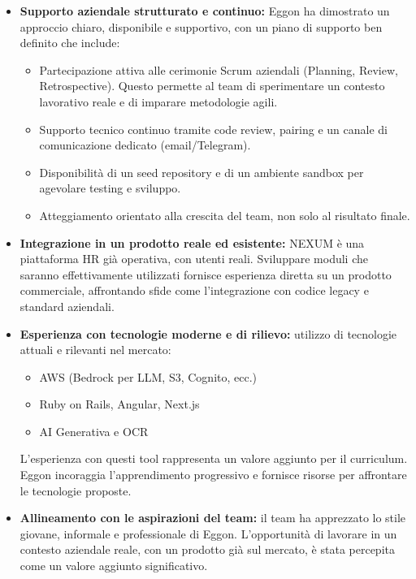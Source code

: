 \documentclass[a4paper,11pt]{article}
\begin{document}
\begin{itemize}
    \item \textbf{Supporto aziendale strutturato e continuo:} Eggon ha dimostrato un approccio chiaro, disponibile e supportivo, con un piano di supporto ben definito che include:
    \begin{itemize}
        \item Partecipazione attiva alle cerimonie Scrum aziendali (Planning, Review, Retrospective). Questo permette al team di sperimentare un contesto lavorativo reale e di imparare metodologie agili.
        \item Supporto tecnico continuo tramite code review, pairing e un canale di comunicazione dedicato (email/Telegram).
        \item Disponibilità di un seed repository e di un ambiente sandbox per agevolare testing e sviluppo.
        \item Atteggiamento orientato alla crescita del team, non solo al risultato finale.
    \end{itemize}

    \item \textbf{Integrazione in un prodotto reale ed esistente:} NEXUM è una piattaforma HR già operativa, con utenti reali. Sviluppare moduli che saranno effettivamente utilizzati fornisce esperienza diretta su un prodotto commerciale, affrontando sfide come l'integrazione con codice legacy e standard aziendali.

    \item \textbf{Esperienza con tecnologie moderne e di rilievo:} utilizzo di tecnologie attuali e rilevanti nel mercato:
    \begin{itemize}
        \item AWS (Bedrock per LLM, S3, Cognito, ecc.)
        \item Ruby on Rails, Angular, Next.js
        \item AI Generativa e OCR
    \end{itemize}
    L'esperienza con questi tool rappresenta un valore aggiunto per il curriculum. Eggon incoraggia l'apprendimento progressivo e fornisce risorse per affrontare le tecnologie proposte.

    \item \textbf{Allineamento con le aspirazioni del team:} il team ha apprezzato lo stile giovane, informale e professionale di Eggon. L'opportunità di lavorare in un contesto aziendale reale, con un prodotto già sul mercato, è stata percepita come un valore aggiunto significativo.


\end{itemize}
\end{document}
